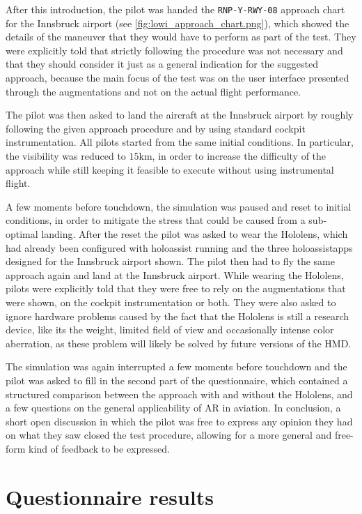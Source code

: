 After this introduction, the pilot was handed the \texttt{RNP-Y-RWY-08} approach chart for the Innsbruck airport (see \autoref{fig:lowi_approach_chart.png}), which showed the details of the maneuver that they would have to perform as part of the test. They were explicitly told that strictly following the procedure was not necessary and that they should consider it just as a general indication for the suggested approach, because the main focus of the test was on the user interface presented through the augmentations and not on the actual flight performance.

The pilot was then asked to land the aircraft at the Innsbruck airport by roughly following the given approach procedure and by using standard cockpit instrumentation. All pilots started from the same initial conditions. In particular, the visibility was reduced to $15$km, in order to increase the difficulty of the approach while still keeping it feasible to execute without using instrumental flight.

A few moments before touchdown, the simulation was paused and reset to initial conditions, in order to mitigate the stress that could be caused from a sub-optimal landing. After the reset the pilot was asked to wear the Hololens, which had already been configured with \gls{holoassist} running and the three \glspl{holoassistapp} designed for the Innsbruck airport shown. The pilot then had to fly the same approach again and land at the Innsbruck airport. While wearing the Hololens, pilots were explicitly told that they were free to rely on the augmentations that were shown, on the cockpit instrumentation or both. They were also asked to ignore hardware problems caused by the fact that the Hololens is still a research device, like its the weight, limited field of view and occasionally intense color aberration, as these problem will likely be solved by future versions of the \gls{HMD}.

The simulation was again interrupted a few moments before touchdown and the pilot was asked to fill in the second part of the questionnaire, which contained a structured comparison between the approach with and without the Hololens, and a few questions on the general applicability of \gls{AR} in aviation. In conclusion, a short open discussion in which the pilot was free to express any opinion they had on what they saw closed the test procedure, allowing for a more general and free-form kind of feedback to be expressed.

\section{Questionnaire results}

